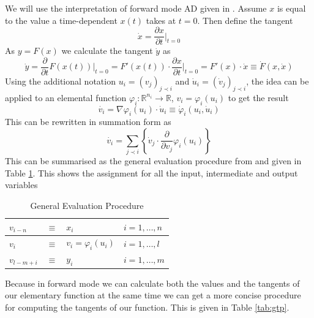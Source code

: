 \documentclass{article}
\begin{document}
We will use the interpretation of forward mode AD given in \cite{dhamarticle}. Assume $x$ is equal to the value a time-dependent $x(t)$ takes at $t=0$. Then define the tangent
\begin{equation}
    \dot{x} = \frac{\partial x}{\partial t} \Big|_{t=0}
\end{equation}
As $y = F(x)$ we calculate the tangent $\dot{y}$ as
\begin{equation}
    \Dot{y} = \frac{\partial}{\partial t} F(x (t)) \Big|_{t=0} 
    = F'(x (t)) \cdot \frac{\partial x}{\partial t} \Big|_{t=0}
    = F'(x) \cdot \Dot{x}
    \equiv \Dot{F}(x, \Dot{x})
\end{equation}
Using the additional notation $u_i = (v_j)_{j \prec i}$ and $\Dot{u}_i = (\Dot{v}_j)_{j \prec i}$, the idea can be applied to an elemental function $\varphi_i : \mathbb{R}^{n_i} \longrightarrow \mathbb{R}$, $v_i = \varphi_i (u_i)$ to get the result
\begin{equation} 
    \Dot{v_i} = \nabla \varphi_i (u_i) \cdot \Dot{u}_i
    \equiv \Dot{\varphi}_i(u_i, \Dot{u}_i)
\end{equation} 
This can be rewritten in summation form as
\begin{equation} \label{tangentequ}
    \Dot{v_i} = \sum_{j \prec i} \left\{ \Dot{v}_j \cdot \frac{\partial}{\partial v_j} \varphi_i (u_i) \right\} 
\end{equation}
This can be summarised as the general evaluation procedure from \cite{evald} and given in Table \ref{tab:gep}.
This shows the assignment for all the input, intermediate and output variables

\begin{table}[h]
    \centering
    \begin{tabular}{|lcll|}
        \hline
        $v_{i-n}$ & $\equiv$ & $x_i$ & $i = 1, \ldots, n$ \\
        \hline
        $v_{i}$ & $\equiv$ & $v_i = \varphi_i (u_i)$ & $i = 1, \ldots, l$ \\
        \hline
        $v_{l-m+i}$ & $\equiv$ & $y_i$ & $i = 1, \ldots, m$ \\
        \hline
    \end{tabular}
    \caption{General Evaluation Procedure}
    \label{tab:gep}
\end{table}

Because in forward mode we can calculate both the values and the tangents of our elementary function at the same time we can get a more concise procedure for computing the tangents of our function. This is given in Table \ref{tab:gtp}.
\end{document}

